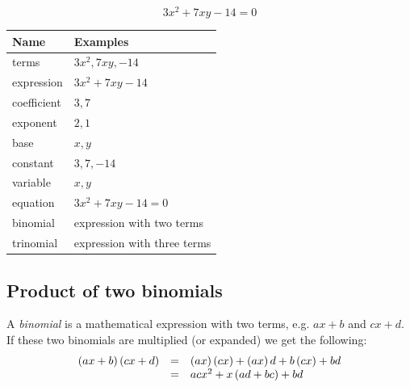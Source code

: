     \begin{equation}
    3x^2 + 7xy -14 = 0
      \end{equation}



\begin{table}[H]
 \begin{center}
\begin{tabular}{|l|l|}
\hline
\textbf{Name} & \textbf{Examples} \\
\hline
terms & $3x^2, 7xy, -14$\\ \hline
expression & $3x^2 + 7xy -14$\\ \hline
coefficient & $3,7$\\ \hline
exponent & $2,1$\\ \hline
base & $x,y$\\ \hline
constant & $3,7,-14$\\ \hline
variable & $x, y$\\ \hline
equation & $3x^2 + 7xy -14 = 0$\\ \hline
binomial & expression with two terms\\ \hline
trinomial & expression with three terms \\ \hline
 \end{tabular}
 \end{center}
\end{table} 

   \par
      \label{m39383*uid4}
            \subsection*{ Product of two binomials}
            \nopagebreak
        \label{m39383*id268015}A \textsl{binomial} is a mathematical expression with two terms, e.g. $ax+b$ and $cx+d$. If these two binomials are multiplied (or expanded) we get the following:
        \label{m39383*id268064}\nopagebreak\noindent{}
    \begin{equation}
    \begin{array}{ccc}\hfill \left(ax+b\right)\left(cx+d\right) & =& \left(ax\right)\left(cx\right)+\left(ax\right)d+b\left(cx\right)+bd\hfill \\ & =& ac{x}^{2}+x\left(ad+bc\right)+bd\hfill \end{array}
      \end{equation}

\par
            \label{m39383*secfhsst!!!underscore!!!id342}\vspace{.5cm} 
      \noindent

